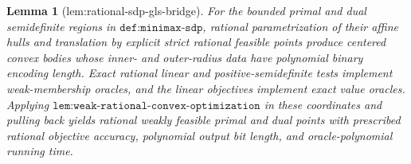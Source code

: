 \documentclass{article}
\newtheorem{lemma}{Lemma}
\begin{document}
\begin{lemma}[lem:rational-sdp-gls-bridge]\label{lem:rational-sdp-gls-bridge}
For the bounded primal and dual semidefinite regions in \(\texttt{def:minimax-sdp}\), rational parametrization of their affine hulls and translation by explicit strict rational feasible points produce centered convex bodies whose inner- and outer-radius data have polynomial binary encoding length. Exact rational linear and positive-semidefinite tests implement weak-membership oracles, and the linear objectives implement exact value oracles. Applying \(\texttt{lem:weak-rational-convex-optimization}\) in these coordinates and pulling back yields rational weakly feasible primal and dual points with prescribed rational objective accuracy, polynomial output bit length, and oracle-polynomial running time.
\end{lemma}
\end{document}
